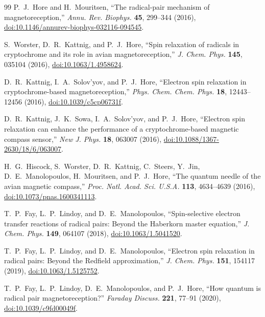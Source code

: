 \documentclass[twocolumn,10pt,amsmath,amssymb,floatfix]{revtex4-2}
\theoremstyle{plain}
\theoremstyle{definition}
\begin{document}
{\begin{thebibliography}{99}
P.~J.~Hore and H.~Mouritsen,
``The radical-pair mechanism of magnetoreception,''
\emph{Annu. Rev. Biophys.} \textbf{45}, 299--344 (2016),
\href{https://doi.org/10.1146/annurev-biophys-032116-094545}{doi:10.1146/annurev-biophys-032116-094545}.

S.~Worster, D.~R.~Kattnig, and P.~J.~Hore,
``Spin relaxation of radicals in cryptochrome and its role in avian magnetoreception,''
\emph{J. Chem. Phys.} \textbf{145}, 035104 (2016),
\href{https://doi.org/10.1063/1.4958624}{doi:10.1063/1.4958624}.

D.~R.~Kattnig, I.~A.~Solov'yov, and P.~J.~Hore,
``Electron spin relaxation in cryptochrome-based magnetoreception,''
\emph{Phys. Chem. Chem. Phys.} \textbf{18}, 12443--12456 (2016),
\href{https://doi.org/10.1039/c5cp06731f}{doi:10.1039/c5cp06731f}.

D.~R.~Kattnig, J.~K.~Sowa, I.~A.~Solov'yov, and P.~J.~Hore,
``Electron spin relaxation can enhance the performance of a cryptochrome-based magnetic compass sensor,''
\emph{New J. Phys.} \textbf{18}, 063007 (2016),
\href{https://doi.org/10.1088/1367-2630/18/6/063007}{doi:10.1088/1367-2630/18/6/063007}.

H.~G.~Hiscock, S.~Worster, D.~R.~Kattnig, C.~Steers, Y.~Jin, D.~E.~Manolopoulos, H.~Mouritsen, and P.~J.~Hore,
``The quantum needle of the avian magnetic compass,''
\emph{Proc. Natl. Acad. Sci. U.S.A.} \textbf{113}, 4634--4639 (2016),
\href{https://doi.org/10.1073/pnas.1600341113}{doi:10.1073/pnas.1600341113}.

T.~P.~Fay, L.~P.~Lindoy, and D.~E.~Manolopoulos,
``Spin-selective electron transfer reactions of radical pairs: Beyond the Haberkorn master equation,''
\emph{J. Chem. Phys.} \textbf{149}, 064107 (2018),
\href{https://doi.org/10.1063/1.5041520}{doi:10.1063/1.5041520}.

T.~P.~Fay, L.~P.~Lindoy, and D.~E.~Manolopoulos,
``Electron spin relaxation in radical pairs: Beyond the Redfield approximation,''
\emph{J. Chem. Phys.} \textbf{151}, 154117 (2019),
\href{https://doi.org/10.1063/1.5125752}{doi:10.1063/1.5125752}.

T.~P.~Fay, L.~P.~Lindoy, D.~E.~Manolopoulos, and P.~J.~Hore,
``How quantum is radical pair magnetoreception?''
\emph{Faraday Discuss.} \textbf{221}, 77--91 (2020),
\href{https://doi.org/10.1039/c9fd00049f}{doi:10.1039/c9fd00049f}.


\end{thebibliography}}
\end{document}
